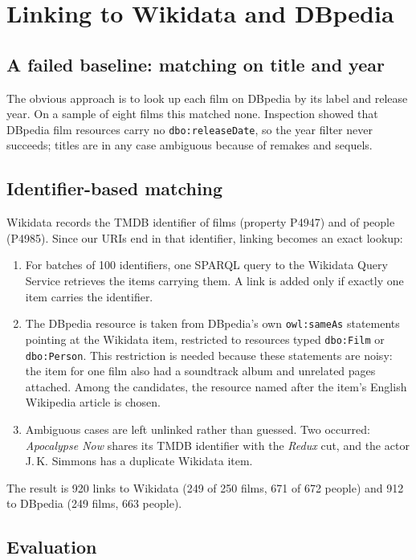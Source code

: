 \documentclass[11pt,a4paper]{article}
\newcommand{\code}[1]{\texttt{#1}}
\begin{document}
\section{Linking to Wikidata and DBpedia}\label{sec:linking}

\subsection{A failed baseline: matching on title and year}

The obvious approach is to look up each film on DBpedia by its label and release year. On a sample of eight films this matched none. Inspection showed that DBpedia film resources carry no \code{dbo:releaseDate}, so the year filter never succeeds; titles are in any case ambiguous because of remakes and sequels.

\subsection{Identifier-based matching}

Wikidata records the TMDB identifier of films (property P4947) and of people (P4985). Since our URIs end in that identifier, linking becomes an exact lookup:
\begin{enumerate}
  \item For batches of 100 identifiers, one SPARQL query to the Wikidata Query Service retrieves the items carrying them. A link is added only if exactly one item carries the identifier.
  \item The DBpedia resource is taken from DBpedia's own \code{owl:sameAs} statements pointing at the Wikidata item, restricted to resources typed \code{dbo:Film} or \code{dbo:Person}. This restriction is needed because these statements are noisy: the item for one film also had a soundtrack album and unrelated pages attached. Among the candidates, the resource named after the item's English Wikipedia article is chosen.
  \item Ambiguous cases are left unlinked rather than guessed. Two occurred: \emph{Apocalypse Now} shares its TMDB identifier with the \emph{Redux} cut, and the actor J.\,K. Simmons has a duplicate Wikidata item.
\end{enumerate}
The result is 920 links to Wikidata (249 of 250 films, 671 of 672 people) and 912 to DBpedia (249 films, 663 people).

\subsection{Evaluation}
\end{document}

